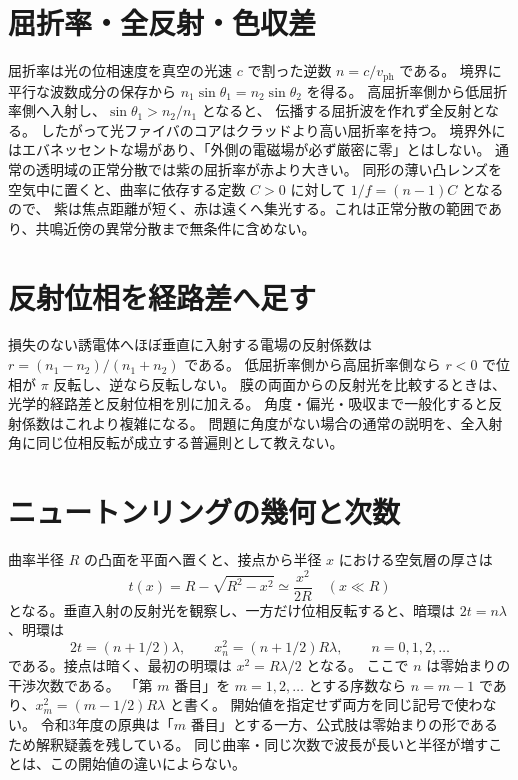 \section{屈折率・全反射・色収差}\label{theory:optics:refraction}
屈折率は光の位相速度を真空の光速 \(c\) で割った逆数 \(n=c/v_{\mathrm{ph}}\) である。
境界に平行な波数成分の保存から \(n_1\sin\theta_1=n_2\sin\theta_2\) を得る。
高屈折率側から低屈折率側へ入射し、\(\sin\theta_1>n_2/n_1\) となると、
伝播する屈折波を作れず全反射となる。
したがって光ファイバのコアはクラッドより高い屈折率を持つ\cite{os_fiber}。
境界外にはエバネッセントな場があり、「外側の電磁場が必ず厳密に零」とはしない。
通常の透明域の正常分散では紫の屈折率が赤より大きい。
同形の薄い凸レンズを空気中に置くと、曲率に依存する定数 \(C>0\) に対して \(1/f=(n-1)C\) となるので、
紫は焦点距離が短く、赤は遠くへ集光する。これは正常分散の範囲であり、共鳴近傍の異常分散まで無条件に含めない。

\section{反射位相を経路差へ足す}\label{theory:optics:reflection}
損失のない誘電体へほぼ垂直に入射する電場の反射係数は \(r=(n_1-n_2)/(n_1+n_2)\) である。
低屈折率側から高屈折率側なら \(r<0\) で位相が \(\pi\) 反転し、逆なら反転しない。
膜の両面からの反射光を比較するときは、光学的経路差と反射位相を別に加える\cite{os_thinfilm}。
角度・偏光・吸収まで一般化すると反射係数はこれより複雑になる。
問題に角度がない場合の通常の説明を、全入射角に同じ位相反転が成立する普遍則として教えない。

\section{ニュートンリングの幾何と次数}\label{theory:optics:newton}
曲率半径 \(R\) の凸面を平面へ置くと、接点から半径 \(x\) における空気層の厚さは
\[
 t(x)=R-\sqrt{R^2-x^2}\simeq\frac{x^2}{2R}\quad(x\ll R)
\]
となる。垂直入射の反射光を観察し、一方だけ位相反転すると、暗環は \(2t=n\lambda\)、明環は
\[
 2t=(n+1/2)\lambda,\qquad x_n^2=(n+1/2)R\lambda,\qquad n=0,1,2,\ldots
\]
である。接点は暗く、最初の明環は \(x^2=R\lambda/2\) となる。
ここで \(n\) は零始まりの干渉次数である。
「第 \(m\) 番目」を \(m=1,2,\ldots\) とする序数なら \(n=m-1\) であり、\(x_m^2=(m-1/2)R\lambda\) と書く。
開始値を指定せず両方を同じ記号で使わない。
令和3年度の原典は「\(m\) 番目」とする一方、公式肢は零始まりの形であるため解釈疑義を残している。
同じ曲率・同じ次数で波長が長いと半径が増すことは、この開始値の違いによらない。

